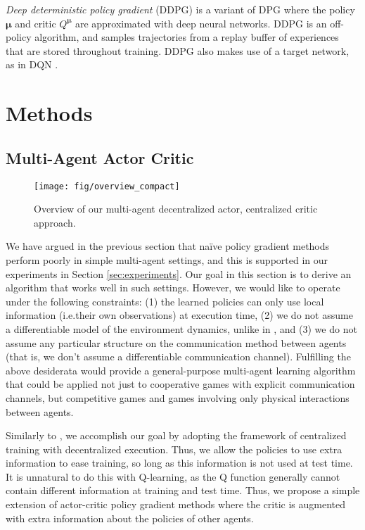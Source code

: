 \documentclass{article}
\newcommand{\cpol}[0]{\pmb{\mu}}
\begin{document}
\textit{Deep deterministic policy gradient} (DDPG) \cite{lillicrap2015continuous} is a variant of DPG where the policy $\cpol$ and critic $Q^{\cpol}$ are approximated with deep neural networks. DDPG is an off-policy algorithm, and samples trajectories from a replay buffer of experiences that are stored throughout training. DDPG also makes use of a target network, as in DQN \cite{mnih2015human}.






\section{Methods}
\label{sec:methods}
\subsection{Multi-Agent Actor Critic}\label{sec:maac}

\begin{wrapfigure}{r}{0.45\textwidth}
\vspace{-20mm}
\texttt{[image: fig/overview\_compact]}
\caption{\label{fig:model} Overview of our multi-agent decentralized actor, centralized critic approach.\vspace{-2mm}}
\end{wrapfigure}

We have argued in the previous section that na{\"i}ve policy gradient methods perform poorly in simple multi-agent settings, and this is supported in our experiments in Section \ref{sec:experiments}. Our goal in this section is to derive an algorithm that works well in such settings. However, we would like to operate under the following constraints: (1) the learned policies can only use local information (i.e.\@ their own observations) at execution time, (2) we do not assume a differentiable model of the environment dynamics, unlike in \cite{mordatch2017emergence}, and (3) we do not assume any particular structure on the communication method between agents (that is, we don't assume a differentiable communication channel). Fulfilling the above desiderata would provide a general-purpose multi-agent learning algorithm that could be applied not just to cooperative games with explicit communication channels, but competitive games and games involving only physical interactions between agents.



Similarly to \cite{foerster16b}, we accomplish our goal by adopting the framework of centralized training with decentralized execution. Thus, we allow the policies to use extra information to ease training, so long as this information is not used at test time. It is unnatural to do this with Q-learning, as the Q function generally cannot contain different information at training and test time. Thus, we propose a simple extension of actor-critic policy gradient methods where the critic is augmented with extra information about the policies of other agents. 
\end{document}
